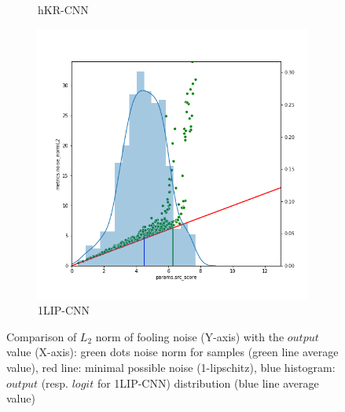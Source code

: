 \documentclass{article}
\begin{document}
\begin{figure}
\begin{subfigure}{.3\textwidth}
  \caption{hKR-CNN}
  \label{fig:l2_norm_VGG_wass}
\end{subfigure}
\begin{subfigure}{.3\textwidth}
  \centering
  \includegraphics[width=1\linewidth]{img/deepfool_vs_score_DeepFool_Lipschitz_Sigmoid_new.png}
  \caption{1LIP-CNN}
  \label{fig:l2_norm_MLP_lipsigmoid}
\end{subfigure}
\caption{Comparison of $L_2$ norm of fooling noise (Y-axis) with the $output$ value (X-axis): green dots noise norm for samples (green line average value), red line:  minimal possible noise (1-lipschitz), blue histogram: $output$ (resp. $logit$ for 1LIP-CNN) distribution (blue line average value)
}
\label{fig:l2norm_vs_logit}
\end{figure}
 
\end{document}

